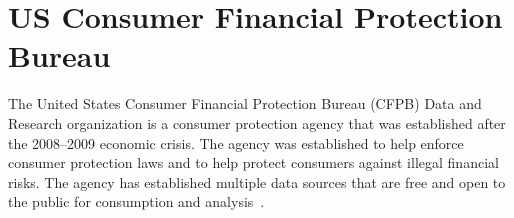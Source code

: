 \section{US Consumer Financial Protection Bureau}

The United States Consumer Financial Protection Bureau (CFPB) Data and Research
organization is a consumer protection agency that was established after the
2008--2009 economic crisis.  The agency was established to help enforce consumer
protection laws and to help protect consumers against illegal financial risks.
The agency has established multiple data sources that are free and open to the
public for consumption and analysis~\cite{hid-sp18-505-CFPB2018}.
